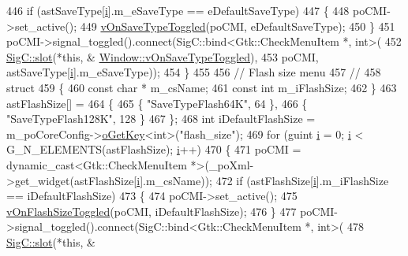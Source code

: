 \begin{DoxyCode}
{{446     \textcolor{keywordflow}{if} (astSaveType[\mbox{\hyperlink{expr-lex_8cpp_acb559820d9ca11295b4500f179ef6392}{i}}].m\_eSaveType == eDefaultSaveType)
447     \{
448       poCMI->set\_active();
449       \mbox{\hyperlink{class_v_b_a_1_1_window_ac28bedaab2e51b684869e85b4b20b7be}{vOnSaveTypeToggled}}(poCMI, eDefaultSaveType);
450     \}
451     poCMI->signal\_toggled().connect(SigC::bind<Gtk::CheckMenuItem *, int>(
452                                       \mbox{\hyperlink{namespace_sig_c_a92e4f19202b77e78ac1db05f5a62f6b6}{SigC::slot}}(*\textcolor{keyword}{this}, &
      \mbox{\hyperlink{class_v_b_a_1_1_window_ac28bedaab2e51b684869e85b4b20b7be}{Window::vOnSaveTypeToggled}}),
453                                       poCMI, astSaveType[\mbox{\hyperlink{expr-lex_8cpp_acb559820d9ca11295b4500f179ef6392}{i}}].m\_eSaveType));
454   \}
455 
456   \textcolor{comment}{// Flash size menu}
457   \textcolor{comment}{//}
458   \textcolor{keyword}{struct}
459   \{
460     \textcolor{keyword}{const} \textcolor{keywordtype}{char} * m\_csName;
461     \textcolor{keyword}{const} \textcolor{keywordtype}{int}    m\_iFlashSize;
462   \}
463   astFlashSize[] =
464   \{
465     \{ \textcolor{stringliteral}{"SaveTypeFlash64K"},   64 \},
466     \{ \textcolor{stringliteral}{"SaveTypeFlash128K"}, 128 \}
467   \};
468   \textcolor{keywordtype}{int} iDefaultFlashSize = m\_poCoreConfig->\mbox{\hyperlink{class_v_b_a_1_1_config_1_1_section_ab169d7aae4e9dde91418ba1668e3ad39}{oGetKey}}<\textcolor{keywordtype}{int}>(\textcolor{stringliteral}{"flash\_size"});
469   \textcolor{keywordflow}{for} (guint \mbox{\hyperlink{expr-lex_8cpp_acb559820d9ca11295b4500f179ef6392}{i}} = 0; \mbox{\hyperlink{expr-lex_8cpp_acb559820d9ca11295b4500f179ef6392}{i}} < G\_N\_ELEMENTS(astFlashSize); \mbox{\hyperlink{expr-lex_8cpp_acb559820d9ca11295b4500f179ef6392}{i}}++)
470   \{
471     poCMI = \textcolor{keyword}{dynamic\_cast<}Gtk::CheckMenuItem *\textcolor{keyword}{>}(\_poXml->get\_widget(astFlashSize[\mbox{\hyperlink{expr-lex_8cpp_acb559820d9ca11295b4500f179ef6392}{i}}].m\_csName));
472     \textcolor{keywordflow}{if} (astFlashSize[\mbox{\hyperlink{expr-lex_8cpp_acb559820d9ca11295b4500f179ef6392}{i}}].m\_iFlashSize == iDefaultFlashSize)
473     \{
474       poCMI->set\_active();
475       \mbox{\hyperlink{class_v_b_a_1_1_window_a592d046d6e85921562d26285387cc45a}{vOnFlashSizeToggled}}(poCMI, iDefaultFlashSize);
476     \}
477     poCMI->signal\_toggled().connect(SigC::bind<Gtk::CheckMenuItem *, int>(
478                                       \mbox{\hyperlink{namespace_sig_c_a92e4f19202b77e78ac1db05f5a62f6b6}{SigC::slot}}(*\textcolor{keyword}{this}, &
}}
\end{DoxyCode}
